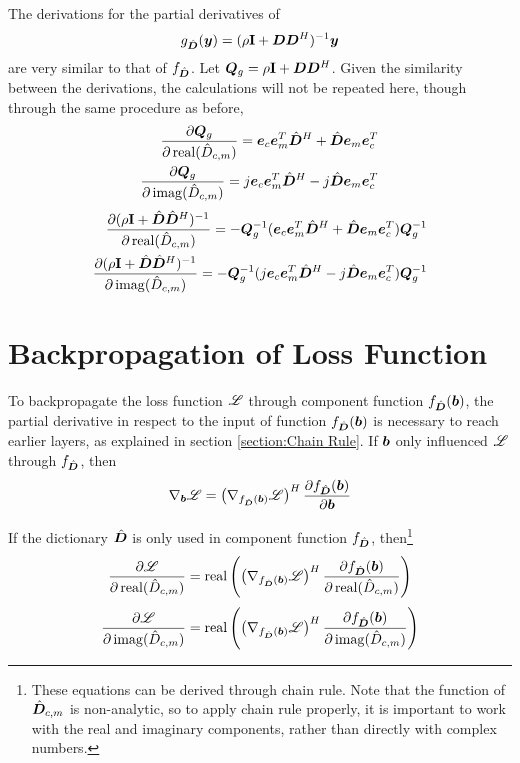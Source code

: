 \begin{appendices}
The derivations for the partial derivatives of
\begin{equation}
g_{\hat{\bm{D}}}(\bm{y}) = (\rho{\bf I} + \bm{D}\bm{D}^H)^{-1}\bm{y}
\end{equation}
are very similar to that of $f_{\hat{\bm{D}}}$. Let $\bm{Q}_g = \rho{\bf I} + \bm{D}\bm{D}^H$. Given the similarity between the derivations, the calculations will not be repeated here, though through the same procedure as before,
%
\begin{equation}
\begin{split}
\frac{\partial \bm{Q}_g}{\partial 
\operatorname{real}(\hat{D}_{c,m})} = \bm{e}_c\bm{e}_m^T\hat{\bm{D}}^H + \hat{\bm{D}}\bm{e}_m\bm{e}_c^T
\\
\frac{\partial \bm{Q}_g}{\partial \operatorname{imag}(\hat{D}_{c,m})} = j\bm{e}_c\bm{e}_m^T\hat{\bm{D}}^H - j\hat{\bm{D}}\bm{e}_m\bm{e}_c^T
\end{split}
\end{equation}
%
\begin{equation}
\begin{split}
\frac{\partial (\rho{\bf I} + \hat{\bm{D}}\hat{\bm{D}}^H)^{-1}}{\partial 
\operatorname{real}(\hat{D}_{c,m})} = -\bm{Q}_g^{-1}(\bm{e}_c\bm{e}_m^T\hat{\bm{D}}^H + \hat{\bm{D}}\bm{e}_m\bm{e}_c^T)\bm{Q}_g^{-1}
\\
\frac{\partial (\rho{\bf I} + \hat{\bm{D}}\hat{\bm{D}}^H)^{-1}}{\partial \operatorname{imag}(\hat{D}_{c,m})} = -\bm{Q}_g^{-1}(j\bm{e}_c\bm{e}_m^T\hat{\bm{D}}^H - j\hat{\bm{D}}\bm{e}_m\bm{e}_c^T)\bm{Q}_g^{-1}
\end{split}
\end{equation}

\section{Backpropagation of Loss Function}
To backpropagate the loss function $\mathscr{L}$ through component function $f_{\hat{\bm{D}}}(\bm{b})$, the partial derivative in respect to the input of function $f_{\hat{\bm{D}}}(\bm{b})$ is necessary to reach earlier layers, as explained in section \ref{section:Chain Rule}. If $\bm{b}$ only influenced $\mathscr{L}$ through $f_{\hat{\bm{D}}}$, then
\begin{equation}
\nabla_{\bm{b}} \mathscr{L} = \left(\nabla_{f_{\hat{\bm{D}}}(\bm{b})} \mathscr{L}\right)^H\frac{\partial f_{\hat{\bm{D}}}(\bm{b})}{\partial \bm{b}}
\end{equation}

If the dictionary $\hat{\bm{D}}$ is only used in component function $f_{\hat{\bm{D}}}$, then\footnote{These equations can be derived through chain rule. Note that the function of $\hat{\bm{D}}_{c,m}$ is non-analytic, so to apply chain rule properly, it is important to work with the real and imaginary components, rather than directly with complex numbers.}
\begin{equation}
\frac{\partial \mathscr{L}}{\partial \operatorname{real}(\hat{D}_{c,m})} = \operatorname{real}\left(\left(\nabla_{f_{\hat{\bm{D}}}(\bm{b})} \mathscr{L}\right)^H\frac{\partial f_{\hat{\bm{D}}}(\bm{b})}{\partial \operatorname{real}(\hat{D}_{c,m})}\right)
\end{equation}
\begin{equation}
\frac{\partial \mathscr{L}}{\partial \operatorname{imag}(\hat{D}_{c,m})} = \operatorname{real}\left(\left(\nabla_{f_{\hat{\bm{D}}}(\bm{b})} \mathscr{L}\right)^H\frac{\partial f_{\hat{\bm{D}}}(\bm{b})}{\partial \operatorname{imag}(\hat{D}_{c,m})}\right)
\end{equation}


\end{appendices}
